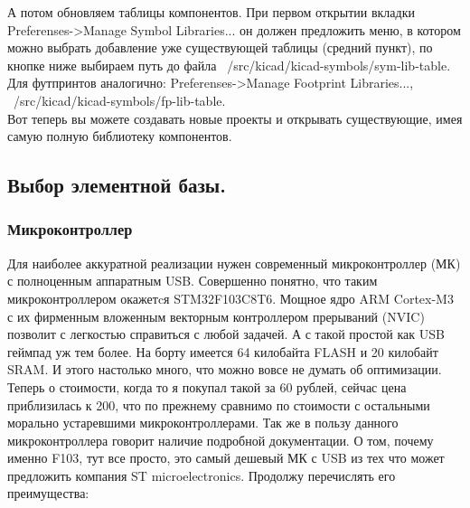 \documentclass[12pt,a4paper]{article}
\begin{document}
    А потом обновляем таблицы компонентов. При первом открытии вкладки
    Preferenses->Manage Symbol Libraries... он должен предложить меню, в
    котором можно выбрать добавление уже существующей таблицы (средний пункт),
    по кнопке ниже
    выбираем путь до файла ~/src/kicad/kicad-symbols/sym-lib-table. Для
    футпринтов аналогично: Preferenses->Manage Footprint Libraries...,
    ~/src/kicad/kicad-symbols/fp-lib-table.\\
    Вот теперь вы можете создавать новые проекты и открывать существующие, имея
    самую полную библиотеку компонентов.
\subsection{Выбор элементной базы.}
\subsubsection{Микроконтроллер}
    Для наиболее аккуратной реализации нужен современный микроконтроллер (МК) с
    полноценным аппаратным USB. Совершенно понятно, что таким микроконтроллером
    окажетcя STM32F103C8T6. Мощное ядро ARM Cortex-M3 с их фирменным вложенным
    векторным контроллером прерываний (NVIC) позволит с легкостью справиться с любой
    задачей. А с такой простой как USB геймпад уж тем более. На борту имеется
    64 килобайта FLASH и 20 килобайт SRAM. И этого настолько много, что можно
    вовсе не думать об оптимизации. Теперь о стоимости, когда то я покупал такой
    за 60 рублей, сейчас цена приблизилась к 200, что по прежнему сравнимо по
    стоимости с остальными морально устаревшими микроконтроллерами. Так же в
    пользу данного микроконтроллера говорит наличие подробной
    документации. О том, почему именно F103, тут все просто, это самый дешевый
    МК с USB из тех что может предложить компания ST microelectronics. Продолжу
    перечислять его преимущества:
\end{document}
